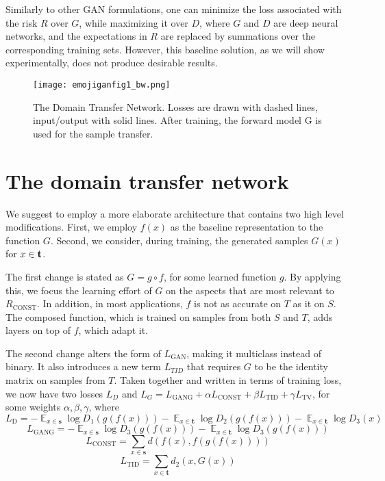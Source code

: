 \documentclass{article} \usepackage{iclr2017_conference,times}
\DeclareMathOperator{\E}{\mathbb{E}}
\begin{document}
Similarly to other GAN formulations, one can minimize the loss associated with the risk $R$ over $G$, while maximizing it over $D$, where $G$ and $D$ are deep neural networks, and the expectations in $R$ are replaced by summations over the corresponding training sets. However, this baseline solution, as we will show experimentally, does not produce desirable results.

\begin{figure}[H]
\centering
\texttt{[image: emojiganfig1\_bw.png]}
\caption{\label{fig:illustration}The Domain Transfer Network. Losses are drawn with dashed lines, input/output with solid lines. After training, the forward model G is used for the sample transfer.}
\end{figure}

\section{The domain transfer network}

We suggest to employ a more elaborate architecture that contains two high level modifications. First, we employ $f(x)$ as the baseline representation to the function $G$. Second, we consider, during training, the generated samples $G(x)$ for $x \in \textbf t$. 

The first change is stated as $G=g \circ f$, for some learned function $g$. By applying this, we focus the learning effort of $G$ on the aspects that are most relevant to $R_\text{CONST}$. In addition, in most applications, $f$ is not as accurate on $T$ as it on $S$. The composed function, which is trained on samples from both $S$ and $T$,  adds layers on top of $f$, which adapt it. 

The second change alters the form of $L_\text{GAN}$, making it multiclass instead of binary. It also introduces a new term $L_{TID}$ that requires $G$ to be the identity matrix on samples from $T$. Taken together and written in terms of training loss, we now have two losses $L_D$ and $L_G = L_\text{GANG} + \alpha L_{\text{CONST}} + \beta L_{\text{TID}} + \gamma L_{\text{TV}}$, for some weights $\alpha,\beta,\gamma$, where
\begin{equation}
L_{\text{D}} = -\E_{x \in \mathbf s} \log D_1(g(f(x))) - \E_{x \in \mathbf t} \log D_2(g(f(x))) - \E_{x \in \mathbf t} \log D_3(x) 
\end{equation}
\begin{equation}
L_{\text{GANG}} = -\E_{x \in \mathbf s} \log D_3(g(f(x))) - \E_{x \in \mathbf t} \log D_3(g(f(x)))  
\end{equation}
\begin{equation}
L_{\text{CONST}} = \sum_{x \in \mathbf s} d(f(x),f(g(f(x))))
\end{equation}
\begin{equation}
L_{\text{TID}} = \sum_{x \in \mathbf t} d_2(x,G(x))
\end{equation}
\end{document}
